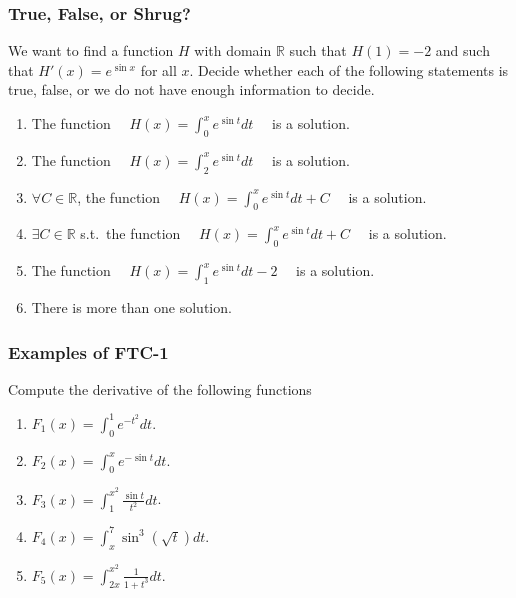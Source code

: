 \documentclass[14pt]{beamer}
\begin{document}
\begin{frame}[t]
	\fontsize{11}{11}\selectfont
	\frametitle{True, False, or Shrug?}

	We want to find a function $H$ with domain $\mathbb{R}$ such that $\displaystyle
	H(1) = -2$ and such that $\displaystyle H'(x) = e^{\sin x}$ for all $x$.
	Decide whether each of the following statements is true, false, or we do not
	have enough information to decide.

	\begin{enumerate}
		\item The function $\displaystyle \quad H(x) = \int_{0}^{x}e^{\sin t}dt \quad$
			is a solution.

		\item The function $\displaystyle \quad H(x) = \int_{2}^{x}e^{\sin t}dt \quad$
			is a solution.

		\item $\forall C \in \mathbb{R}$, the function
			$\displaystyle \quad H(x) = \int_{0}^{x}e^{\sin t}dt + C \quad$ is a
			solution.

		\item $\exists C \in \mathbb{R}$ s.t.\ the function
			$\displaystyle \quad H(x) = \int_{0}^{x}e^{\sin t}dt + C \quad$ is a
			solution.

		\item The function $\displaystyle \quad H(x) = \int_{1}^{x}e^{\sin t}dt -2 \quad$
			is a solution.

		\item There is more than one solution.
	\end{enumerate}
\end{frame}

\begin{frame}[t]
	\fontsize{13}{13}\selectfont
	\frametitle{Examples of FTC-1}

	Compute the derivative of the following functions

	\begin{enumerate}
		\item $\displaystyle F_{1}(x) = \int_{0}^{1}e^{-t^2}dt$. \\
			\vfill

		\item $\displaystyle F_{2}(x) = \int_{0}^{x}e^{-\sin t}dt$. \\
			\vfill

		\item $\displaystyle F_{3}(x) = \int_{1}^{x^2}\frac{\sin t}{t^{2}}dt$. \\
			\vfill

		\item $\displaystyle F_{4}(x) = \! \int_{x}^{7}\sin^{3}\! \! \left( \sqrt{t}\right
			) \! dt$. \\
			\vfill

		\item $\displaystyle F_{5}(x) = \int_{2x}^{x^2}\frac{1}{1+t^{3}}dt$. \\
	\end{enumerate}
\end{frame}
\end{document}
